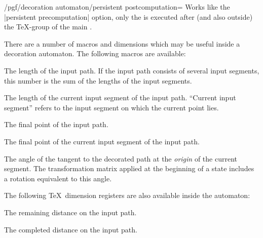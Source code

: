 \begin{command}{\pgfdeclaredecoration{}}
\begin{command}{\state{}}
    \begin{key}{/pgf/decoration automaton/persistent postcomputation=}
      Works like the |persistent precomputation| option, only the
       is executed after (and also outside) the
      \TeX-group of the main .
    \end{key}

    There are a number of macros and dimensions which may be useful
    inside a decoration automaton. The following macros are available:

    \begin{command}{\pgfdecoratedpathlength}
      The length of the input path. If the input path consists of
      several input segments, this number is the sum of the lengths of the
      input segments.
    \end{command}

    \begin{command}{\pgfdecoratedinputsegmentlength}
      The length of the current input segment of the input path. ``Current
      input segment''  refers to the input segment on which the current point
      lies.
    \end{command}
		
    \begin{command}{\pgfpointdecoratedpathlast}
      The final point of the input path.
    \end{command}

    \begin{command}{\pgfpointdecoratedinputsegmentlast}
      The final point of the current input segment of the input path.
    \end{command}
		
    \begin{command}{\pgfdecoratedangle}
      The angle of the tangent to the decorated path at the \emph{origin}
      of the current segment. The transformation matrix applied at
      the beginning of a state includes a rotation equivalent to
      this angle.
    \end{command}
		
    The following \TeX\ dimension registers are also available inside the
    automaton:

    \begin{command}{\pgfdecoratedremainingdistance}
      The remaining distance on the input path.
    \end{command}
		
    \begin{command}{\pgfdecoratedcompleteddistance}
      The completed distance on the input path.
    \end{command}


\end{command}
\end{command}
